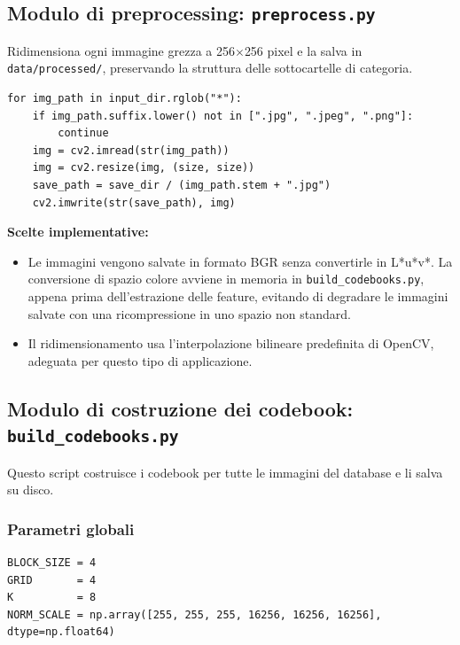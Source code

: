 \documentclass[12pt, a4paper]{article}
\begin{document}
\subsection{Modulo di preprocessing: \texttt{preprocess.py}}

Ridimensiona ogni immagine grezza a 256$\times$256 pixel e la salva in
\texttt{data/processed/}, preservando la struttura delle sottocartelle di categoria.

\begin{lstlisting}[caption={Ciclo principale di \texttt{preprocess.py}}]
for img_path in input_dir.rglob("*"):
    if img_path.suffix.lower() not in [".jpg", ".jpeg", ".png"]:
        continue
    img = cv2.imread(str(img_path))
    img = cv2.resize(img, (size, size))
    save_path = save_dir / (img_path.stem + ".jpg")
    cv2.imwrite(str(save_path), img)
\end{lstlisting}

\textbf{Scelte implementative:}
\begin{itemize}
    \item Le immagini vengono salvate in formato BGR senza convertirle in L*u*v*. La
          conversione di spazio colore avviene in memoria in \texttt{build\_codebooks.py},
          appena prima dell'estrazione delle feature, evitando di degradare le immagini
          salvate con una ricompressione in uno spazio non standard.
    \item Il ridimensionamento usa l'interpolazione bilineare predefinita di OpenCV,
          adeguata per questo tipo di applicazione.
\end{itemize}

\subsection{Modulo di costruzione dei codebook: \texttt{build\_codebooks.py}}

Questo script costruisce i codebook per tutte le immagini del database e li salva su disco.

\subsubsection{Parametri globali}

\begin{lstlisting}[caption={Parametri di configurazione di \texttt{build\_codebooks.py}}]
BLOCK_SIZE = 4
GRID       = 4
K          = 8
NORM_SCALE = np.array([255, 255, 255, 16256, 16256, 16256], dtype=np.float64)
\end{lstlisting}
\end{document}

